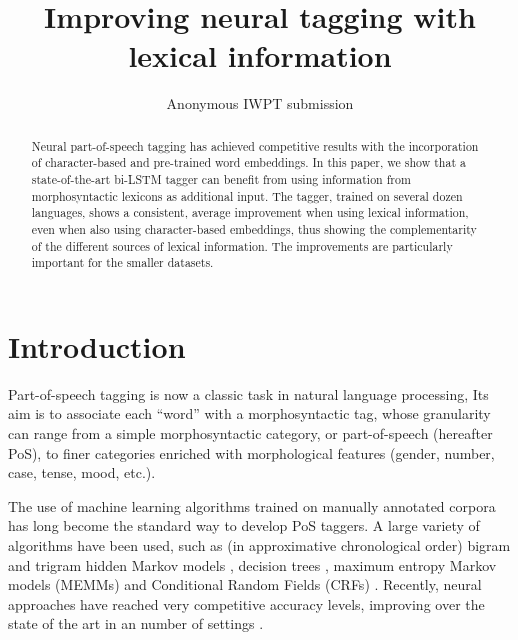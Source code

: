 \documentclass[11pt,a4paper]{article}
\title{Improving neural tagging with lexical information}
\author{Anonymous IWPT submission}
\date{}
\newcommand\hm[1]{\textcolor{blue}{#1}}
\newcommand\bs[1]{\textcolor{red}{#1}}
\newcommand\discussion[1]{}
\newcommand\final[1]{#1}
\begin{document}
\maketitle
\begin{abstract}
  Neural part-of-speech tagging has achieved competitive results with the incorporation of character-based and
  pre-trained word embeddings. In this paper, we show that a state-of-the-art bi-LSTM tagger can benefit from using
  information from morphosyntactic lexicons as additional input. The tagger, trained on several dozen languages, shows a
  consistent, \discussion{\hm{\textbf{HM what follows could be shortened:} average improvement of 2.6\% tagging accuracy
      for systems without character-based embeddings, and an improvement of 0.6\% in the presence of character-based
      embeddings, which indicates that morphosyntactic lexicons do indeed provide information that is not captured by
      the embeddings themselves, both character-based and word-level.}  \bs{\textbf{BS: I agree. I suggest:} average
      improvement when using lexical information, even when also using character-based embeddings, thus showing the
      complementarity of the different sources of lexical information.}}\final{average improvement when using lexical
    information, even when also using character-based embeddings, thus showing the complementarity of the different
    sources of lexical information.} The improvements are particularly important for the smaller datasets.
\end{abstract}


\section{Introduction}

Part-of-speech tagging is now a classic task in natural language processing, \discussion{\hm{\textbf{HM candidate for
      deleletion/compression:} for which many systems have been developed or adapted for a large variety of
    languages.}\bs{\textbf{BS: I suggest simple deletion}}} Its aim is to associate each ``word'' with a morphosyntactic
tag, whose granularity can range from a simple morphosyntactic category, or part-of-speech (hereafter PoS), to finer
categories enriched with morphological features (gender, number, case, tense, mood, etc.).

The use of machine learning algorithms trained on manually annotated corpora has long become the standard way to develop
PoS taggers. A large variety of algorithms have been used, such as (in approximative chronological order) bigram and
trigram hidden Markov models \cite{merialdo94,brants96,brants00}, decision trees \cite{schmid94,magerman95}, maximum
entropy Markov models (MEMMs) \cite{ratnaparkhi96} and Conditional Random Fields (CRFs)
\cite{lafferty01,constant12}. Recently, neural approaches have reached very competitive accuracy levels, improving over
the state of the art in an number of settings \cite{plank16}.
\end{document}
